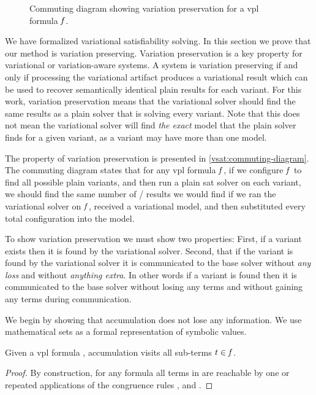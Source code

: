 \label{section:vsat:variation-preservation}
%
\begin{figure}[h]
  \centering
  
  \caption{Commuting diagram showing variation preservation for a \ac{vpl}
    formula $\mathit{f}$.}%
  \label{vsat:commuting-diagram}
\end{figure}
%
We have formalized variational satisfiability solving. In this section we prove
that our method is variation preserving. Variation preservation is a key
property for variational or variation-aware systems. A system is variation
preserving if and only if processing the variational artifact produces a
variational result which can be used to recover semantically identical plain
results for each variant. For this work, variation preservation means that the
variational solver should find the same results as a plain solver that is
solving every variant. Note that this does not mean the variational solver will
find \emph{the exact} model that the plain solver finds for a given variant, as
a variant may have more than one model.

The property of variation preservation is presented in
\autoref{vsat:commuting-diagram}. The commuting diagram states that for any
\ac{vpl} formula $\mathit{f}$, if we configure $\mathit{f}$ to find all possible plain
variants, and then run a plain \ac{sat} solver on each variant, we should find
the same number of / results we would find if we ran the
variational solver on $\mathit{f}$, received a variational model, and then
substituted every total configuration into the model.

To show variation preservation we must show two properties: First, if a variant
exists then it is found by the variational solver. Second, that if the variant
is found by the variational solver it is communicated to the base solver without
\emph{any loss} and without \emph{anything extra}. In other words if a variant
is found then it is communicated to the base solver without losing any terms and
without gaining any terms during communication.

We begin by showing that accumulation does not lose any information. We use
mathematical sets as a formal representation of symbolic values.

\begin{lemma}
  \label{lemma:acc:all-terms}
  Given a \ac{vpl} formula \fV{}, accumulation visits all sub-terms $\mathit{t}{} \in
  \mathit{f}{}$.
\end{lemma}
%
\begin{proof}
  By construction, for any formula \fV{} all terms in \tV{} are reachable by one
  or repeated applications of the congruence rules \acOrV{}, \acAndV{} and
  \acNotV{}.
\end{proof}

